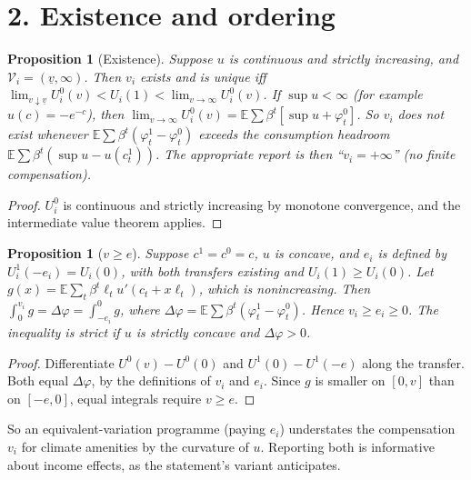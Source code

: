 \documentclass[11pt]{article}
\newtheorem{proposition}[theorem]{Proposition}
\theoremstyle{definition}
\begin{document}
\section*{2. Existence and ordering}
\begin{proposition}[Existence]\label{prop:exist}
Suppose $u$ is continuous and strictly increasing, and $\mathcal V_i=(\underline v,\infty)$. Then $v_i$ exists and is unique
iff $\lim_{v\downarrow\underline v}U_i^0(v)<U_i(1)<\lim_{v\to\infty}U_i^0(v)$. If $\sup u<\infty$ (for example
$u(c)=-e^{-c}$), then $\lim_{v\to\infty}U^0_i(v)=\mathbb E\sum\beta^t[\sup u+\varphi^0_t]$. So $v_i$ does not exist whenever
$\mathbb E\sum\beta^t(\varphi^1_t-\varphi^0_t)$ exceeds the consumption headroom $\mathbb E\sum\beta^t(\sup u-u(c^1_t))$.
The appropriate report is then ``$v_i=+\infty$'' (no finite compensation).
\end{proposition}
\begin{proof}
$U^0_i$ is continuous and strictly increasing by monotone convergence, and the intermediate value theorem applies.
\end{proof}
\begin{proposition}[$v\ge e$]\label{prop:order}
Suppose $c^1=c^0=c$, $u$ is concave, and $e_i$ is defined by $U_i^1(-e_i)=U_i(0)$, with both transfers existing and
$U_i(1)\ge U_i(0)$. Let $g(x)=\mathbb E\sum_t\beta^t\ell_tu'(c_t+x\ell_t)$, which is nonincreasing. Then
$\int_0^{v_i}g=\Delta\varphi=\int_{-e_i}^0g$, where $\Delta\varphi=\mathbb E\sum\beta^t(\varphi^1_t-\varphi^0_t)$. Hence
$v_i\ge e_i\ge0$. The inequality is strict if $u$ is strictly concave and $\Delta\varphi>0$.
\end{proposition}
\begin{proof}
Differentiate $U^0(v)-U^0(0)$ and $U^1(0)-U^1(-e)$ along the transfer. Both equal $\Delta\varphi$, by the definitions of
$v_i$ and $e_i$. Since $g$ is smaller on $[0,v]$ than on $[-e,0]$, equal integrals require $v\ge e$.
\end{proof}
So an equivalent-variation programme (paying $e_i$) understates the compensation $v_i$ for climate amenities by the
curvature of $u$. Reporting both is informative about income effects, as the statement's variant anticipates.
\end{document}
